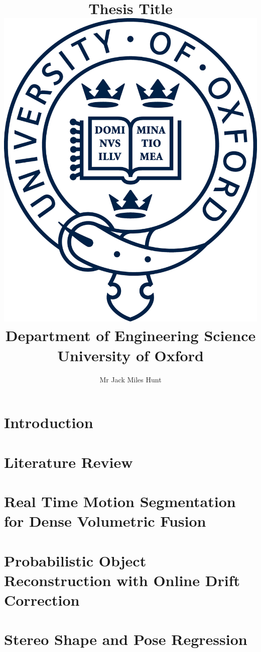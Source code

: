 \documentclass[
  12pt, 
]{book}
\title{
    {Thesis Title}\\
    \vspace{10 mm}
    {\includegraphics[scale=1]{pre_chapters/figures/oxford_logo.png}\\
    {\large Department of Engineering Science\\ University of Oxford}\\}
}
\author{Mr Jack Miles Hunt}
\date{}
\begin{document}
\maketitle

%

%

%

%

\tableofcontents
\listoffigures
\listoftables

\chapter{Introduction}


\chapter{Literature Review}


\chapter{Real Time Motion Segmentation for Dense Volumetric Fusion}


\chapter{Probabilistic Object Reconstruction with Online Drift Correction}


\chapter{Stereo Shape and Pose Regression}

\end{document}
